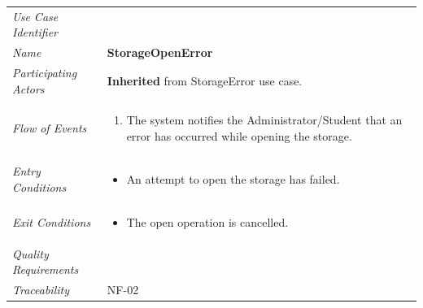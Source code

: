 \documentclass[12pt,letterpaper]{article}
\begin{document}
\begin{center}
	\begin{tabu} to 
		\toprule
		Use Case Identifier & \storageopenerror{} \\
		Name & {\bf StorageOpenError} \\
		Participating Actors & \textbf{Inherited} from StorageError use case. \\
		Flow of Events & 
		\begin{minipage}[t]{\linewidth}
		    \begin{enumerate}
			    \item The system notifies the Administrator/Student that an error has occurred while opening the storage.
			\end{enumerate}
		\end{minipage} \\

		Entry Conditions &
		\begin{minipage}[t]{\linewidth}
			\begin{itemize}
			    \item An attempt to open the storage has failed.
	        \end{itemize}
		\end{minipage} \\

		Exit Conditions &
		\begin{minipage}[t]{\linewidth}
			\begin{itemize}
			    \item The open operation is cancelled.
	        \end{itemize}
		\end{minipage} \\

		Quality Requirements & \\

		Traceability & NF-02 \\
		\toprule
	\end{tabu}
\end{center}
\end{document}
